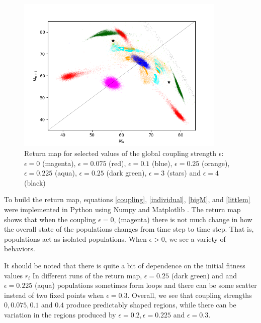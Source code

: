 \documentclass[conference]{IEEEtran}
\begin{document}
 \begin{figure}[t]
 \centering
    \includegraphics[width=100mm]{prettypicture}
    
    \caption{ Return map for selected values of  the global coupling strength $\epsilon$:  $\epsilon =0$ (magenta), $\epsilon = 0.075$ (red), $\epsilon = 0.1$ (blue), $\epsilon = 0.25$ (orange), $\epsilon = 0.225$ (aqua), $\epsilon = 0.25$ (dark green), $\epsilon = 3 $ (stars) and $\epsilon = 4$ (black)}
 \label{prettypicture}
\end{figure} 

To build the return map, equations \ref{coupling},  \ref{individual}, \ref{bigM},  and \ref{littlem} were implemented  in Python using Numpy \cite{numpy} and Matplotlib \cite{matplotlib}.   The return map shows that when the coupling $\epsilon = 0$,  (magenta) there is not much change in how the overall state of the populations changes from time step to time step.  That is, populations  act as isolated populations.   When $\epsilon > 0$, we see a variety of behaviors. 

It should be noted that there is quite a bit of dependence on the initial fitness values $r_i$   In different runs of the return map, $\epsilon = 0.25$ (dark green) and and $\epsilon = 0.225$ (aqua) populations sometimes form loops and there can be some scatter instead of two fixed points when $\epsilon = 0.3$.  Overall, we see that coupling strengths $0, 0.075, 0.1$ and $0.4$ produce predictably shaped regions, while there can be variation in the regions produced by $\epsilon = 0.2,  \epsilon = 0.225$ and $\epsilon = 0.3$. 


    
\end{document}
